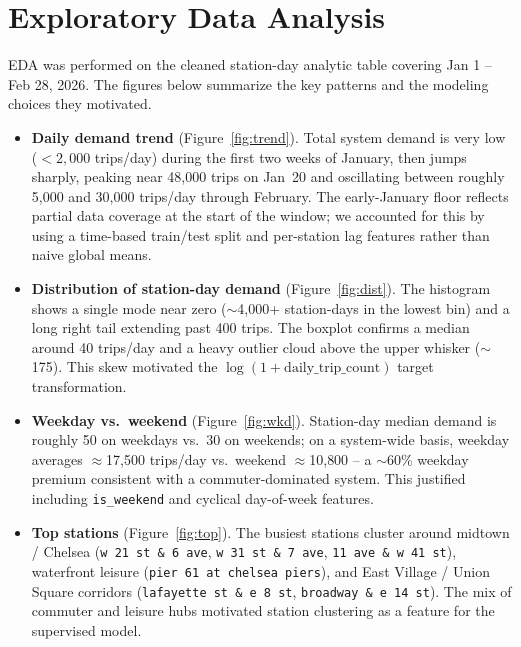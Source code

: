 \documentclass[11pt]{article}
\begin{document}
\section{Exploratory Data Analysis}

EDA was performed on the cleaned station-day analytic table covering
Jan 1 -- Feb 28, 2026. The figures below summarize the key patterns and the
modeling choices they motivated.

\begin{itemize}[leftmargin=1.4em]
  \item \textbf{Daily demand trend} (Figure~\ref{fig:trend}). Total system
        demand is very low ($<2{,}000$ trips/day) during the first two weeks
        of January, then jumps sharply, peaking near 48{,}000 trips on
        Jan~20 and oscillating between roughly 5{,}000 and 30{,}000 trips/day
        through February. The early-January floor reflects partial data
        coverage at the start of the window; we accounted for this by using
        a time-based train/test split and per-station lag features rather
        than naive global means.
  \item \textbf{Distribution of station-day demand}
        (Figure~\ref{fig:dist}). The histogram shows a single mode near zero
        ($\sim$4{,}000+ station-days in the lowest bin) and a long right
        tail extending past 400 trips. The boxplot confirms a median around
        40 trips/day and a heavy outlier cloud above the upper whisker
        ($\sim$175). This skew motivated the
        $\log(1+\text{daily\_trip\_count})$ target transformation.
  \item \textbf{Weekday vs.\ weekend} (Figure~\ref{fig:wkd}). Station-day
        median demand is roughly 50 on weekdays vs.\ 30 on weekends; on a
        system-wide basis, weekday averages $\approx$17{,}500 trips/day vs.\
        weekend $\approx$10{,}800 -- a $\sim$60\% weekday premium consistent
        with a commuter-dominated system. This justified including
        \texttt{is\_weekend} and cyclical day-of-week features.
  \item \textbf{Top stations} (Figure~\ref{fig:top}). The busiest stations
        cluster around midtown / Chelsea (\texttt{w 21 st \& 6 ave},
        \texttt{w 31 st \& 7 ave}, \texttt{11 ave \& w 41 st}), waterfront
        leisure (\texttt{pier 61 at chelsea piers}), and East Village /
        Union Square corridors (\texttt{lafayette st \& e 8 st},
        \texttt{broadway \& e 14 st}). The mix of commuter and leisure hubs
        motivated station clustering as a feature for the supervised model.

\end{itemize}
\end{document}
